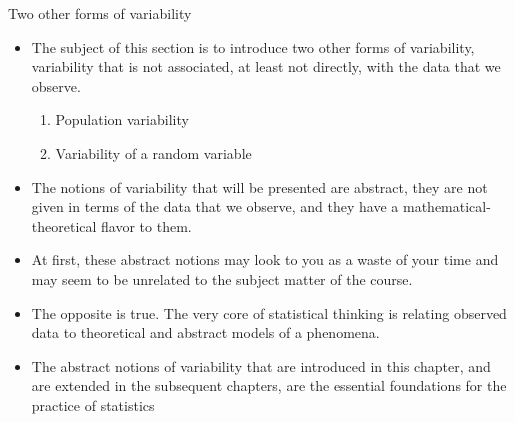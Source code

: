 \documentclass[10pt]{beamer}\usepackage[]{graphicx}\usepackage[]{color}
\begin{document}
\begin{frame}{Two other forms of variability}
	
	\begin{itemize}
		
		\item  The subject of this section is to introduce two other forms of
		variability, variability that is not associated, at least not directly,
		with the data that we observe. \pause
		\begin{enumerate}
			\item Population variability
			\item Variability of a random variable
		\end{enumerate}

	\pause
		
		\item The notions of variability that will be presented are abstract, they are
		not given in terms of the data that we observe, and they have a
		mathematical-theoretical flavor to them. 
		
		\pause
		
		\item At first, these abstract
		notions may look to you as a waste of your time and may seem to be
		unrelated to the subject matter of the course. 
		
		\pause
		
		\item The opposite is true. The
		very core of statistical thinking is relating observed data to
		theoretical and abstract models of a phenomena. 
		
		\pause 
		\item The abstract notions of variability that are introduced in this
		chapter, and are extended in the subsequent chapters, are the essential foundations for the practice of
		statistics
	\end{itemize}
	
\end{frame}
\end{document}
